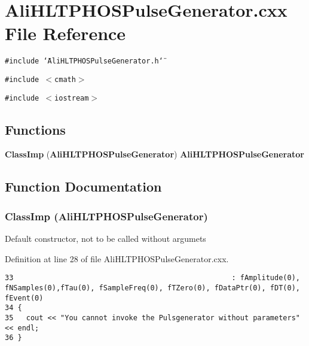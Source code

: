 \section{Ali\-HLTPHOSPulse\-Generator.cxx File Reference}
\label{AliHLTPHOSPulseGenerator_8cxx}


{\tt \#include \char`\"{}Ali\-HLTPHOSPulse\-Generator.h\char`\"{}}\par
{\tt \#include $<$cmath$>$}\par
{\tt \#include $<$iostream$>$}\par
\subsection*{Functions}
\begin{CompactItemize}
\item 
{\bf Class\-Imp} ({\bf Ali\-HLTPHOSPulse\-Generator}) {\bf Ali\-HLTPHOSPulse\-Generator}
\end{CompactItemize}


\subsection{Function Documentation}
\subsubsection{\setlength{\rightskip}{0pt plus 5cm}Class\-Imp ({\bf Ali\-HLTPHOSPulse\-Generator})}\label{AliHLTPHOSPulseGenerator_8cxx_a0}


Default constructor, not to be called without argumets 

Definition at line 28 of file Ali\-HLTPHOSPulse\-Generator.cxx.

\footnotesize\begin{verbatim}33                                                   : fAmplitude(0), fNSamples(0),fTau(0), fSampleFreq(0), fTZero(0), fDataPtr(0), fDT(0), fEvent(0)
34 {
35   cout << "You cannot invoke the Pulsgenerator without parameters" << endl;
36 }
\end{verbatim}\normalsize 


